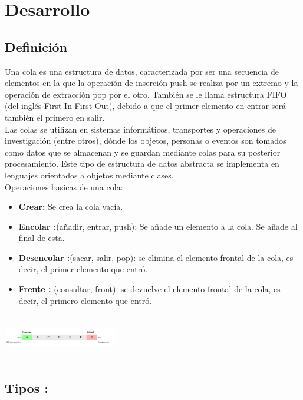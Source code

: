 \documentclass[twoside,twocolumn]{article}
\begin{document}
	\section {Desarrollo}
	
	\subsection{Definición}
	Una cola es una estructura de datos, caracterizada por ser una secuencia de elementos en la que la operación de inserción push se realiza por un extremo y la operación de extracción pop por el otro. También se le llama estructura FIFO (del inglés First In First Out), debido a que el primer elemento en entrar será también el primero en salir.\\
	
	Las colas se utilizan en sistemas informáticos, transportes y operaciones de investigación (entre otros), dónde los objetos, personas o eventos son tomados como datos que se almacenan y se guardan mediante colas para su posterior procesamiento. Este tipo de estructura de datos abstracta se implementa en lenguajes orientados a objetos mediante clases. \\
	
	Operaciones basicas de una cola:
	
	\begin{itemize}
		\item \textbf{Crear:} Se crea la cola vacía. \\
		\item \textbf{Encolar :}(añadir, entrar, push): Se añade un elemento a la cola. Se añade al final de esta.
		\item \textbf{Desencolar :}(sacar, salir, pop): se elimina el elemento frontal de la cola, es decir, el primer elemento que entró.
		\item \textbf{Frente :} (consultar, front): se devuelve el elemento frontal de la cola, es decir, el primero elemento que entró.	
	\end{itemize}
	
	\begin{center}
		\includegraphics[width=5cm, height=2cm]{colas.png}
	\end{center}
	
	
	\subsection{Tipos : }
	
\end{document}
